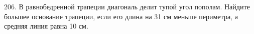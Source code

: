 206. В равнобедренной трапеции диагональ делит тупой угол пополам. Найдите большее основание трапеции, если его длина на 31 см меньше периметра, а средняя линия равна 10 см.\\
